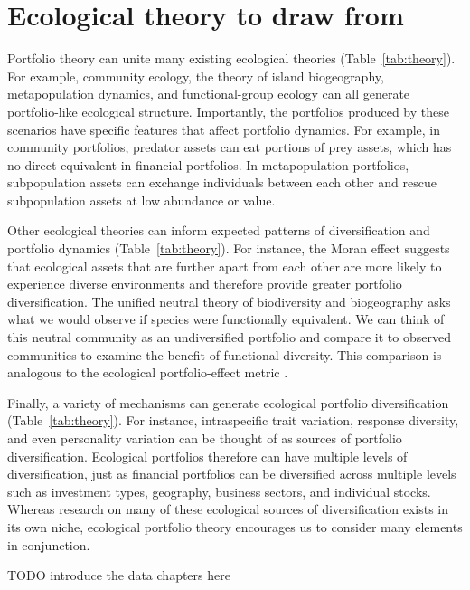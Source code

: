 \section{Ecological theory to draw from}\label{ecological-theory-to-draw-from}

Portfolio theory can unite many existing ecological theories (Table~\ref{tab:theory}). For example, community ecology, the theory of island biogeography, metapopulation dynamics, and functional-group ecology can all generate portfolio-like ecological structure. Importantly, the portfolios produced by these scenarios have specific features that affect portfolio dynamics. For example, in community portfolios, predator assets can eat portions of prey assets, which has no direct equivalent in financial portfolios. In metapopulation portfolios, subpopulation assets can exchange individuals between each other and rescue subpopulation assets at low abundance or value.

Other ecological theories can inform expected patterns of diversification and portfolio dynamics (Table~\ref{tab:theory}). For instance, the Moran effect suggests that ecological assets that are further apart from each other are more likely to experience diverse environments and therefore provide greater portfolio diversification. The unified neutral theory of biodiversity and biogeography asks what we would observe if species were functionally equivalent. We can think of this neutral community as an undiversified portfolio and compare it to observed communities to examine the benefit of functional diversity. This comparison is analogous to the ecological portfolio-effect metric \citep[e.g.][]{doak1998, schindler2010, anderson2015}.

Finally, a variety of mechanisms can generate ecological portfolio diversification (Table~\ref{tab:theory}). For instance, intraspecific trait variation, response diversity, and even personality variation can be thought of as sources of portfolio diversification. Ecological portfolios therefore can have multiple levels of diversification, just as financial portfolios can be diversified across multiple levels such as investment types, geography, business sectors, and individual stocks. Whereas research on many of these ecological sources of diversification exists in its own niche, ecological portfolio theory encourages us to consider many elements in conjunction.



TODO introduce the data chapters here


